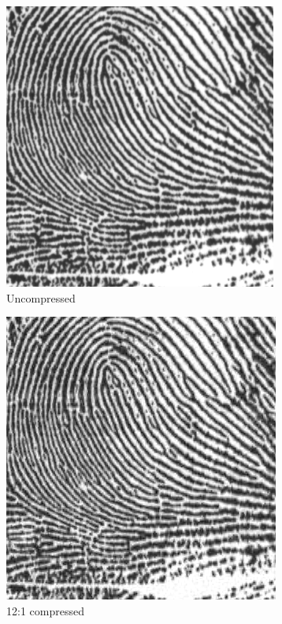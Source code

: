 \begin{figure}[H]
\centering
\begin{subfigure}{.32\textwidth}
  \centering
  \includegraphics[width=.7\linewidth]{figures/uncompressed_finger.png}
  \caption{Uncompressed}
  \label{fig:sub1}
\end{subfigure}%
\begin{subfigure}{.32\textwidth}
  \centering
  \includegraphics[width=.7\linewidth]{figures/compressed_finger(30comp).png}
  \caption{12:1 compressed}
  \label{fig:sub1}
\end{subfigure}%
\begin{subfigure}{.32\textwidth}
  \centering

\end{subfigure}
\end{figure}
